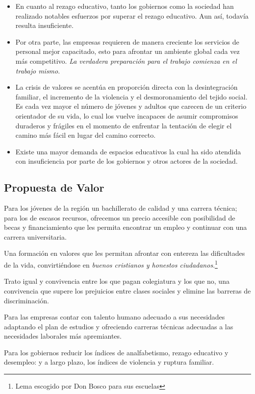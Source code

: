 \begin{itemize}
	\item En cuanto al rezago educativo, tanto los gobiernos como la sociedad han realizado notables esfuerzos por superar el rezago educativo. Aun así, todavía resulta insuficiente.
	\item Por otra parte, las empresas requieren de manera creciente los servicios de personal mejor capacitado, esto para afrontar un ambiente global cada vez más competitivo. \emph{La verdadera preparación para el trabajo comienza en el trabajo mismo}.
	\item La crisis de valores se acentúa en proporción directa con la desintegración familiar, el incremento de la violencia y el desmoronamiento del tejido social. Es cada vez mayor el número de jóvenes y adultos que carecen de un criterio orientador de su vida, lo cual los vuelve incapaces de asumir compromisos duraderos y frágiles en el momento de enfrentar la tentación de elegir el camino más fácil en lugar del camino correcto.
	\item Existe una mayor demanda de espacios educativos la cual ha sido atendida con insuficiencia por parte de los gobiernos y otros actores de la sociedad.
\end{itemize}

\subsection{Propuesta de Valor}

Para los jóvenes de la región un bachillerato de calidad y una carrera técnica; para los de escasos recursos, ofrecemos un precio accesible con posibilidad de becas y financiamiento que les permita encontrar un empleo y continuar con una carrera universitaria.

Una formación en valores que les permitan afrontar con entereza las dificultades de la vida, convirtiéndose en \emph{buenos cristianos y honestos ciudadanos}.\footnote{Lema escogido por Don Bosco para sus escuelas}

Trato igual y convivencia entre los que pagan colegiatura y los que no, una convivencia que supere los prejuicios entre clases sociales y elimine las barreras de discriminación.

Para las empresas contar con talento humano adecuado a sus necesidades adaptando el plan de estudios y ofreciendo carreras técnicas adecuadas a las necesidades laborales más apremiantes.

Para los gobiernos reducir los índices de analfabetismo, rezago educativo y desempleo: y a largo plazo, los índices de violencia y ruptura familiar.

